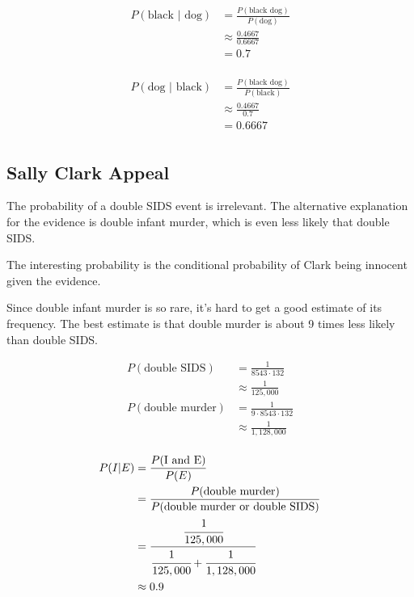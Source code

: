 \documentclass[landscape]{exam}
\begin{document}
  \begin{align*}
    P(\text{black } | \text{ dog}) & = \frac{P(\text{black dog})}{P(\text{dog})} \\
                                   & \approx \frac{0.4667}{0.6667} \\
                                   & = 0.7 \\
  \end{align*}

  \begin{align*}
    P(\text{dog } | \text{ black}) & = \frac{P(\text{black dog})}{P(\text{black})} \\
                                   & \approx \frac{0.4667}{0.7} \\
                                   & = 0.6667 \\
  \end{align*}

  \subsection{Sally Clark Appeal}
  The probability of a double SIDS event is irrelevant. The alternative
  explanation for the evidence is double infant murder, which is even less
  likely that double SIDS. 
  
  The interesting probability is the conditional probability of Clark being
  innocent given the evidence.

  Since double infant murder is so rare, it's hard to get a good estimate of its
  frequency. The best estimate is that double murder is about 9 times less
  likely than double SIDS.

  \begin{align*}
    P(\text{double SIDS}) & = \frac{1}{8543 \cdot 132} \\
                            & \approx \frac{1}{125,000} \\
    P(\text{double murder}) & = \frac{1}{9 \cdot 8543 \cdot 132} \\
                            & \approx \frac{1}{1,128,000} \\
  \end{align*}

  \begin{align*}
    P(I | E) & = \frac{P(\text{I and E})}{P(E)} \\
             & = \frac{P(\text{double murder})}{P(\text{double murder or double SIDS})} \\
             & = \frac{\cfrac{1}{125,000}}{\cfrac{1}{125,000} + \cfrac{1}{1,128,000}} \\
             & \approx 0.9 \\
  \end{align*}
\end{document}
